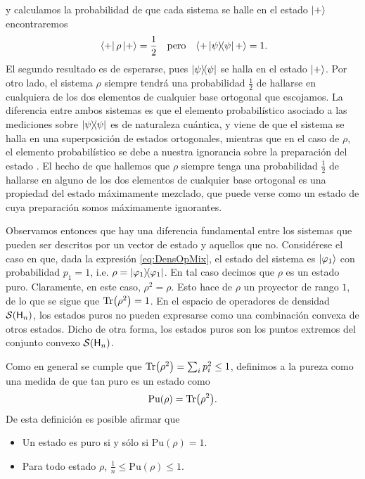 y calculamos la probabilidad de que cada sistema se halle en el estado $\ket{+}$ encontraremos
\begin{align}
    \bra{+}\rho\ket{+}=\frac{1}{2} && \text{pero} &&\langle + \dyad{\psi} +\rangle=1\rlap{.}\nonumber
\end{align}
El segundo resultado es de esperarse, pues $\dyad{\psi}$ se halla en el estado $\ket{+}$. Por otro lado, el sistema $\rho$ siempre tendrá una probabilidad $\frac{1}{2}$ de hallarse en cualquiera de los dos elementos de cualquier base ortogonal que escojamos. La diferencia entre ambos sistemas es que el elemento probabilístico asociado a las mediciones sobre $\dyad{\psi}$ es de naturaleza cuántica, y viene de que el sistema se halla en una superposición de estados ortogonales, mientras que en el caso de $\rho$, el elemento probabilístico se debe a nuestra ignorancia sobre la preparación del estado \cite{Chuang}. El hecho de que hallemos que $\rho$ siempre tenga una probabilidad $\frac{1}{2}$ de hallarse en alguno de los dos elementos de cualquier base ortogonal es una propiedad del estado máximamente mezclado, que puede verse como un estado de cuya preparación somos máximamente ignorantes.



Observamos entonces que hay una diferencia fundamental entre los sistemas que pueden ser descritos por un vector de estado y aquellos que no. Considérese el caso en que, dada la expresión \ref{eq:DensOpMix}, el estado del sistema es $\ket{\varphi_{1}}$ con  probabilidad $p_{1}=1$, i.e. $\rho=\dyad{\varphi_{1}}$. En tal caso decimos que $\rho$ es un estado puro. Claramente, en este caso, $\rho^{2}=\rho$. Esto hace de $\rho$ un proyector de rango $1$, de lo que se sigue que $\Tr(\rho^{2})=1$. En el espacio de operadores de densidad $\mathcal{S}({\sf H}_{n})$, los estados puros no pueden expresarse como una combinación convexa de otros estados. Dicho de otra forma, los estados puros son los puntos extremos del conjunto convexo $\mathcal{S}({\sf H}_{n})$.

Como en general se cumple que $\Tr(\rho^{2})=\sum_i p^2_i\leq 1$, definimos a la pureza como una medida de que tan puro es un estado como \cite{Jaeger}
\begin{equation}
    \text{Pu}(\rho)=\Tr(\rho^{2}).\nonumber
\end{equation}
De esta definición es posible afirmar que
\begin{itemize}
    \item Un estado es puro si y sólo si $\text{Pu}(\rho)=1$.
    \item Para todo estado $\rho$, $\frac{1}{n}\leq \text{Pu}(\rho)\leq 1$.
\end{itemize}

